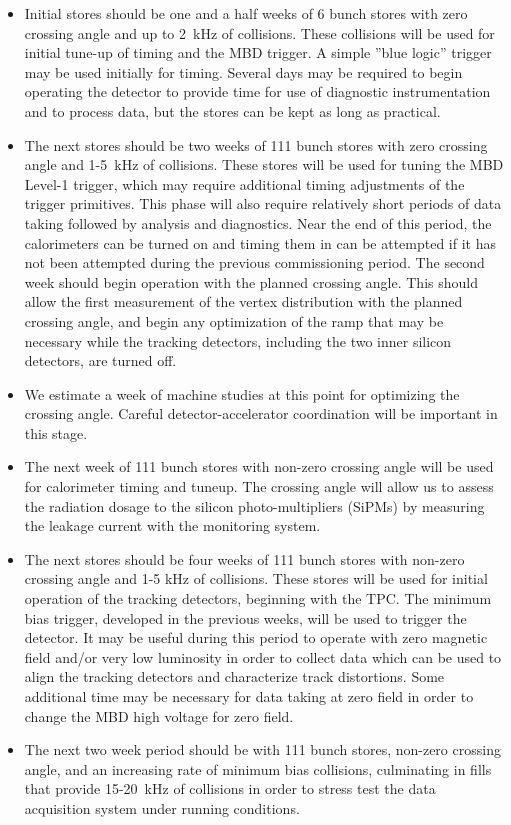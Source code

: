 \begin{itemize}

\item Initial stores should be one and a half weeks of 6 bunch stores with zero crossing
angle and up to 2~kHz of collisions.  
These collisions will be used for initial tune-up of timing and the MBD trigger.  
A simple ''blue logic'' trigger may be used initially for timing.
Several days may be required to begin operating the detector to provide time
for use of diagnostic instrumentation and to process data, but the stores can
be kept as long as practical.

\item The next stores should be two weeks of 111 bunch stores with zero crossing angle
and 1-5~kHz of collisions.  These stores will be used for tuning the MBD Level-1
trigger, which may require additional timing adjustments of the trigger primitives.
This phase will also require relatively short periods of data taking followed by analysis
and diagnostics.
Near the end of this period, the calorimeters can be turned on and timing them in can be
attempted if it has not been attempted during the previous commissioning period.
The second week should begin operation with the planned crossing angle.  
This should allow the first measurement of the vertex distribution with the
planned crossing angle, and begin any optimization of the ramp that may be necessary
while the tracking detectors, including the two inner silicon detectors,
are turned off.

\item We estimate a week of machine studies at this point for 
optimizing the crossing angle.  Careful detector-accelerator coordination will be important in this stage.

\item The next week of 111 bunch stores with non-zero crossing angle will be used for calorimeter timing and tuneup.
The crossing angle will allow us to assess the radiation dosage to the silicon photo-multipliers (SiPMs)
by measuring the leakage current with the monitoring system.

\item The next stores should be four weeks of 111 bunch stores with non-zero crossing angle
and 1-5 kHz of collisions.  
These stores will be used for initial operation of the tracking detectors, beginning with the TPC.  
The minimum bias trigger, developed in the previous weeks, will be used to trigger the
detector.  
It may be useful during this period to operate with zero magnetic field and/or very
low luminosity in order to collect data which can be used to align the tracking
detectors and characterize track distortions.
Some additional time may be necessary for data taking at zero field in order to
change the MBD high voltage for zero field.

\item The next two week period should be with 111 bunch stores, non-zero crossing
angle, and an increasing rate of minimum bias collisions, culminating in fills that
provide 15-20~kHz of collisions in order to stress test the data acquisition system
under running conditions.  

\end{itemize}

